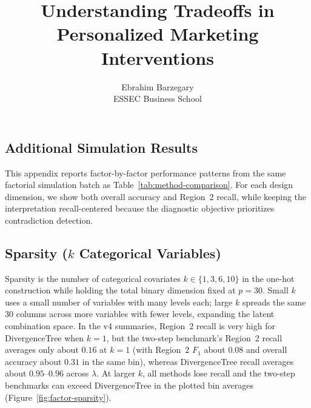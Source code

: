 \documentclass[11pt,letterpaper,english]{article}
\theoremstyle{definition}
\theoremstyle{definition}
\begin{document}
\begin{bibunit}

\newpage

\setcounter{table}{0}
\setcounter{page}{1}
\setcounter{figure}{0}
\setcounter{equation}{0}
\setcounter{footnote}{0}
\renewcommand{\thetable}{A\arabic{table}}
\renewcommand{\thefigure}{A\arabic{figure}}
\renewcommand{\theequation}{A.\arabic{equation}}
\renewcommand{\thepage}{\roman{page}}
\title{Understanding Tradeoffs in Personalized Marketing Interventions}


\author{
       Ebrahim Barzegary \\
        ESSEC Business School\\
 }

\begin{appendices}

\section{Additional Simulation Results}
\label{app:simulation-details}

This appendix reports factor-by-factor performance patterns from the same factorial simulation batch as Table~\ref{tab:method-comparison}. For each design dimension, we show both overall accuracy and Region~2 recall, while keeping the interpretation recall-centered because the diagnostic objective prioritizes contradiction detection.

\subsection{Sparsity (\texorpdfstring{$k$}{k} Categorical Variables)}
Sparsity is the number of categorical covariates $k \in \{1,3,6,10\}$ in the one-hot construction while holding the total binary dimension fixed at $p=30$. Small $k$ uses a small number of variables with many levels each; large $k$ spreads the same $30$ columns across more variables with fewer levels, expanding the latent combination space. In the v4 summaries, Region~2 recall is very high for DivergenceTree when $k{=}1$, but the two-step benchmark's Region~2 recall averages only about $0.16$ at $k{=}1$ (with Region~2 $F_1$ about $0.08$ and overall accuracy about $0.31$ in the same bin), whereas DivergenceTree recall averages about $0.95$--$0.96$ across $\lambda$. At larger $k$, all methods lose recall and the two-step benchmarks can exceed DivergenceTree in the plotted bin averages (Figure~\ref{fig:factor-sparsity}).



\end{appendices}
\end{bibunit}
\end{document}
